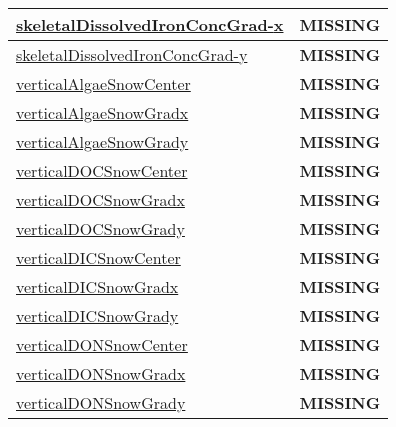 {\begin{center}
\begin{longtable}{| p{2.0in} | p{4.0in} |}
    \hline
    \hyperref[subsec:var_sec_tracer_reconstruction_skeletalDissolvedIronConcGradx]{skeletalDissolvedIronConcGrad-}\hyperref[subsec:var_sec_tracer_reconstruction_skeletalDissolvedIronConcGradx]{x  }& {\bf \color{red} MISSING} \\
    \hline
    \hyperref[subsec:var_sec_tracer_reconstruction_skeletalDissolvedIronConcGrady]{skeletalDissolvedIronConcGrad-}\hyperref[subsec:var_sec_tracer_reconstruction_skeletalDissolvedIronConcGrady]{y  }& {\bf \color{red} MISSING} \\
    \hline
    \hyperref[subsec:var_sec_tracer_reconstruction_verticalAlgaeSnowCenter]{verticalAlgaeSnowCenter} & {\bf \color{red} MISSING} \\
    \hline
    \hyperref[subsec:var_sec_tracer_reconstruction_verticalAlgaeSnowGradx]{verticalAlgaeSnowGradx} & {\bf \color{red} MISSING} \\
    \hline
    \hyperref[subsec:var_sec_tracer_reconstruction_verticalAlgaeSnowGrady]{verticalAlgaeSnowGrady} & {\bf \color{red} MISSING} \\
    \hline
    \hyperref[subsec:var_sec_tracer_reconstruction_verticalDOCSnowCenter]{verticalDOCSnowCenter} & {\bf \color{red} MISSING} \\
    \hline
    \hyperref[subsec:var_sec_tracer_reconstruction_verticalDOCSnowGradx]{verticalDOCSnowGradx} & {\bf \color{red} MISSING} \\
    \hline
    \hyperref[subsec:var_sec_tracer_reconstruction_verticalDOCSnowGrady]{verticalDOCSnowGrady} & {\bf \color{red} MISSING} \\
    \hline
    \hyperref[subsec:var_sec_tracer_reconstruction_verticalDICSnowCenter]{verticalDICSnowCenter} & {\bf \color{red} MISSING} \\
    \hline
    \hyperref[subsec:var_sec_tracer_reconstruction_verticalDICSnowGradx]{verticalDICSnowGradx} & {\bf \color{red} MISSING} \\
    \hline
    \hyperref[subsec:var_sec_tracer_reconstruction_verticalDICSnowGrady]{verticalDICSnowGrady} & {\bf \color{red} MISSING} \\
    \hline
    \hyperref[subsec:var_sec_tracer_reconstruction_verticalDONSnowCenter]{verticalDONSnowCenter} & {\bf \color{red} MISSING} \\
    \hline
    \hyperref[subsec:var_sec_tracer_reconstruction_verticalDONSnowGradx]{verticalDONSnowGradx} & {\bf \color{red} MISSING} \\
    \hline
    \hyperref[subsec:var_sec_tracer_reconstruction_verticalDONSnowGrady]{verticalDONSnowGrady} & {\bf \color{red} MISSING} \\

\end{longtable}
\end{center}}
